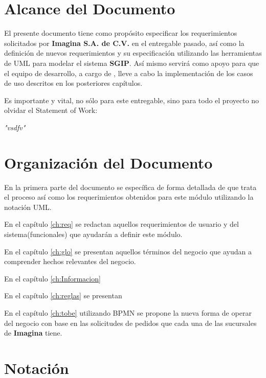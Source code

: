\section{Alcance del Documento}

El presente documento tiene como propósito especificar los requerimientos solicitados por \textbf{Imagina S.A. de C.V.} en el entregable pasado, así como la definición de nuevos requerimientos y su especificación utilizando las herramientas de UML para modelar el sistema \textbf{SGIP}. Así mismo servirá como apoyo para que el equipo de desarrollo, a cargo de \textbf{\lider}, lleve a cabo la implementación de los casos de uso descritos en los posteriores capítulos.

Es importante y vital, no sólo para este entregable, sino para todo el proyecto no olvidar el Statement of Work:

\begin{center}
	\textit{"vsdfv"}
\end{center}

\section{Organización del Documento}

En la primera parte del documento se específica de forma detallada de que trata el proceso así como los requerimientos obtenidos para este módulo utilizando la notación UML.

En el capítulo \ref{ch:req} se redactan aquellos requerimientos de usuario y del sistema(funcionales) que ayudarán a definir este módulo.

En el capítulo \ref{ch:glo} se presentan aquellos términos del negocio que ayudan a comprender hechos relevantes del negocio.

En el capítulo \ref{ch:Informacion}

En el capítulo \ref{ch:reglas} se presentan


En el capítulo \ref{ch:tobe} utilizando BPMN se propone la nueva forma de operar del negocio con base en las solicitudes de pedidos que cada una de las sucursales de \textbf{Imagina} tiene.


\section{Notación}

\notacion





